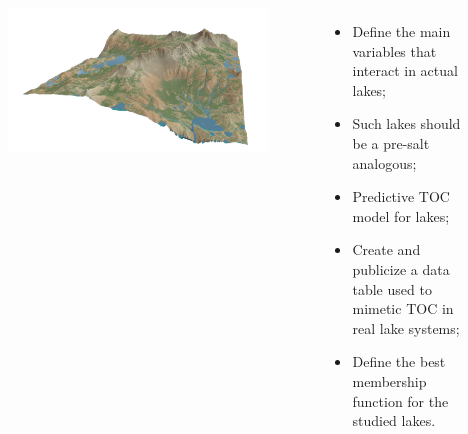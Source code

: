 \documentclass[aspectratio=169]{beamer} %
\begin{document}
{

{ \begin{frame}
	\vspace{1cm}
	\begin{center}
	\begin{large}
	\color{blue}{Objectives}
	\end{large}
	\end{center}
\begin{flushright}
    \begin{columns}

        \centering
	     	\begin{figure}
		\centering
		\includegraphics[scale=0.3]{images/HL.png}
	\end{figure}
        \centering
         \begin{itemize}
          \item Define the main variables that interact in actual lakes;   
          \pause
           \item Such lakes should be a pre-salt analogous;
           \pause
          \item Predictive TOC model for lakes;
           \pause
           \item Create and publicize a data table used to mimetic TOC in real lake systems;
           \pause
           \item Define the best membership function for the studied lakes.
     

\end{itemize}
\end{columns}
\end{flushright}
\end{frame}}}
\end{document}

